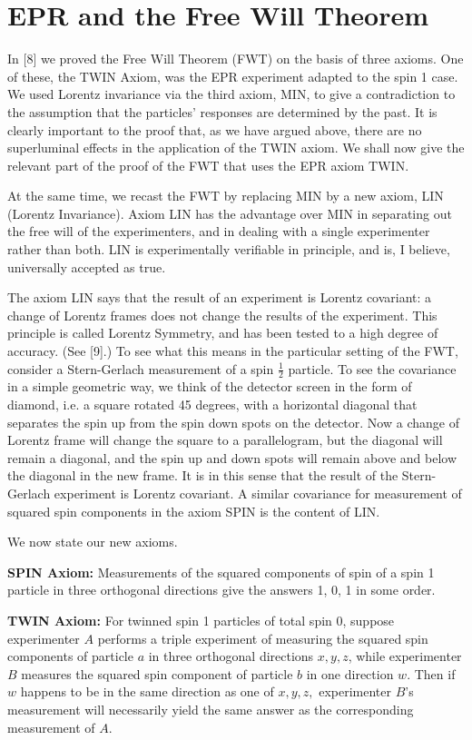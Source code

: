 \documentclass{article}
\begin{document}
\section*{EPR and the Free Will Theorem}
In [8] we proved the Free Will Theorem (FWT) on the basis of three axioms. One of these, the TWIN Axiom, was the EPR experiment adapted to the spin 1 case. We used Lorentz invariance via the third axiom, MIN, to give a contradiction to the assumption that the particles’ responses are determined by the past. It is clearly important to the proof that, as we have argued above, there are no superluminal effects in the application of the TWIN axiom. We shall now give the relevant part of the proof of the FWT that uses the EPR axiom TWIN.

At the same time, we recast the FWT by replacing MIN by a new axiom, LIN (Lorentz Invariance). Axiom LIN has the advantage over MIN in separating out the free will of the experimenters, and in dealing with a single experimenter rather than both. LIN is experimentally verifiable in principle, and is, I believe, universally accepted as true.

The axiom LIN says that the result of an experiment is Lorentz covariant: a change of Lorentz frames does not change the results of the experiment. This principle is called Lorentz Symmetry, and has been tested to a high degree of accuracy. (See [9].) To see what this means in the particular setting of the FWT, consider a Stern-Gerlach measurement of a spin $\frac{1}{2}$ particle. To see the covariance in a simple geometric way, we think of the detector screen in the form of diamond, i.e. a square rotated 45 degrees, with a horizontal diagonal that separates the spin up from the spin down spots on the detector. Now a change of Lorentz frame will change the square to a parallelogram, but the diagonal will remain a diagonal, and the spin up and down spots will remain above and below the diagonal in the new frame. It is in this sense that the result of the Stern-Gerlach experiment is Lorentz covariant. A similar covariance for measurement of squared spin components in the axiom SPIN is the content of LIN.

We now state our new axioms.

{\bf SPIN Axiom:} Measurements of the squared components of spin of a spin 1 particle in three orthogonal directions give the answers 1, 0, 1 in some order.

{\bf TWIN Axiom:} For twinned spin 1 particles of total spin $0$, suppose experimenter $A$ performs a triple experiment of measuring the squared spin components of particle $a$ in three orthogonal directions $x, y, z$, while experimenter $B$ measures the squared spin component of particle $b$ in one direction $w$. Then if $w$ happens to be in the same direction as one of $x, y, z,$ experimenter $B$'s measurement will necessarily yield the same answer as the corresponding measurement of $A$.
\end{document}

